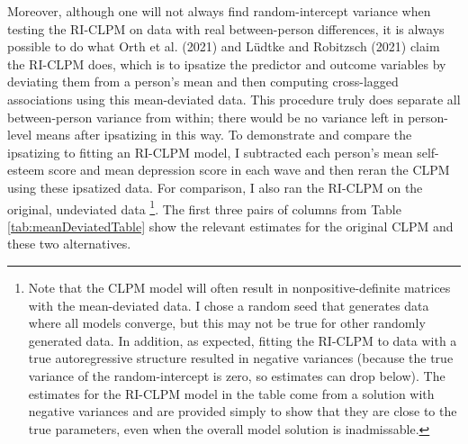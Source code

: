 \documentclass[
  english,
  man,floatsintext]{apa6}
\begin{document}
Moreover, although one will not always find random-intercept variance when testing the RI-CLPM on data with real between-person differences, it is always possible to do what Orth et al. (2021) and Lüdtke and Robitzsch (2021) claim the RI-CLPM does, which is to ipsatize the predictor and outcome variables by deviating them from a person's mean and then computing cross-lagged associations using this mean-deviated data. This procedure truly does separate all between-person variance from within; there would be no variance left in person-level means after ipsatizing in this way. To demonstrate and compare the ipsatizing to fitting an RI-CLPM model, I subtracted each person's mean self-esteem score and mean depression score in each wave and then reran the CLPM using these ipsatized data. For comparison, I also ran the RI-CLPM on the original, undeviated data \footnote{Note that the CLPM model will often result in nonpositive-definite matrices with the mean-deviated data. I chose a random seed that generates data where all models converge, but this may not be true for other randomly generated data. In addition, as expected, fitting the RI-CLPM to data with a true autoregressive structure resulted in negative variances (because the true variance of the random-intercept is zero, so estimates can drop below). The estimates for the RI-CLPM model in the table come from a solution with negative variances and are provided simply to show that they are close to the true parameters, even when the overall model solution is inadmissable.}. The first three pairs of columns from Table \ref{tab:meanDeviatedTable} show the relevant estimates for the original CLPM and these two alternatives.
\end{document}
